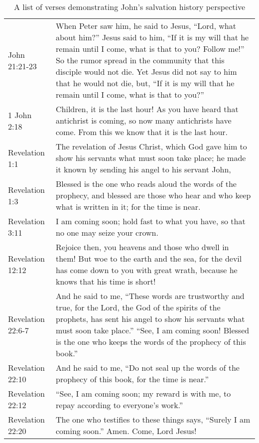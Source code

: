 \begin{table}
    \footnotesize
    \begin{center}
        \begin{tabulary}{\linewidth}{lL}
            \toprule
John 21:21-23 & When Peter saw him, he said to 
Jesus, ``Lord, what about him?'' Jesus said to him, ``If it is my will that 
he remain until I come, what is that to you? Follow me!'' So the rumor 
spread in the community that this disciple would not die. Yet Jesus did not say 
to him that he would not die, but, ``If it is my will that he remain until I 
come, what is that to you?'' \\
1 John 2:18 & Children, it is the last hour! As you 
have heard that antichrist is coming, so now many antichrists have come. From 
this we know that it is the last hour. \\
Revelation 1:1 & The revelation of Jesus 
Christ, which God gave him to show his servants what must soon take place; he 
made it known by sending his angel to his servant John, \\
Revelation 1:3 & Blessed 
is the one who reads aloud the words of the prophecy, and blessed are those 
who hear and who keep what is written in it; for the time is near. \\
Revelation 3:11 & I am coming soon; hold fast to what you have, so that no one may seize 
your crown. \\
Revelation 12:12 & Rejoice then, you heavens and those who dwell in 
them! But woe to the earth and the sea, for the devil has come down to you with 
great wrath, because he knows that his time is short! \\
Revelation 22:6-7 & And he 
said to me, ``These words are trustworthy and true, for the Lord, the God of 
the spirits of the prophets, has sent his angel to show his servants what must 
soon take place.'' ``See, I am coming soon! Blessed is the one who keeps the 
words of the prophecy of this book.'' \\
Revelation 22:10 & And he said to me, ``Do not seal up the 
words of the prophecy of this book, for the time is near.'' \\
Revelation 22:12 & 
``See, I am coming soon; my reward is with me, to repay according to everyone's 
work.'' \\
Revelation 22:20 & The one who testifies to these things says, ``Surely I 
am coming soon.'' Amen. Come, Lord Jesus! \\
            \bottomrule
        \end{tabulary}
    \end{center}
    \caption{A list of verses demonstrating John's salvation history perspective}
    \label{tab:shp-john}
\end{table}

